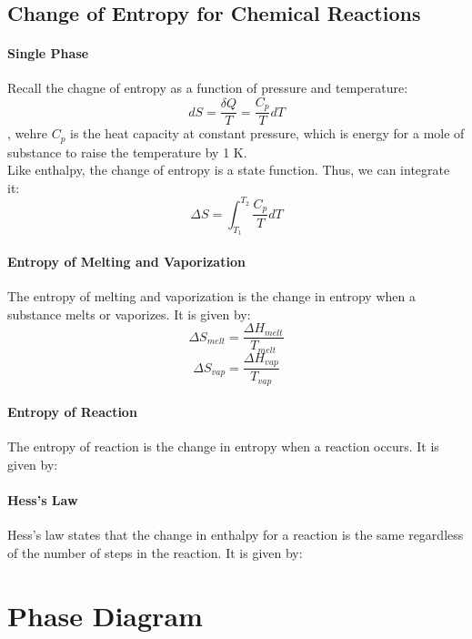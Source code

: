 \documentclass[11pt]{report}
\begin{document}
\begin{Gibb's Energy}
\begin{example}
\begin{align*}
    \end{align*}
\end{example}
\subsection{Change of Entropy for Chemical Reactions}
\paragraph{Single Phase} Recall the chagne of entropy as a function of pressure and temperature:
\begin{equation}
    dS = \frac{\delta Q}{T} = \frac{C_p}{T}dT
\end{equation}
, wehre $C_p$ is the heat capacity at constant pressure, which is energy for a mole of substance to raise the temperature by 1 K.\\
Like enthalpy, the change of entropy is a state function. Thus, we can integrate it:
\begin{equation}
    \Delta S = \int_{T_1}^{T_2} \frac{C_p}{T}dT
\end{equation}
\paragraph{Entropy of Melting and Vaporization} The entropy of melting and vaporization is the change in entropy when a substance melts or vaporizes. It is given by:
\begin{equation}
    \Delta S_{melt} = \frac{\Delta H_{melt}}{T_{melt}}
\end{equation}
\begin{equation}
    \Delta S_{vap} = \frac{\Delta H_{vap}}{T_{vap}}
\end{equation}
\paragraph{Entropy of Reaction} The entropy of reaction is the change in entropy when a reaction occurs. It is given by:    
\paragraph{Hess's Law} Hess's law states that the change in enthalpy for a reaction is the same regardless of the number of steps in the reaction. It is given by:
\section{Phase Diagram}

\end{Gibb's Energy}
\end{document}

